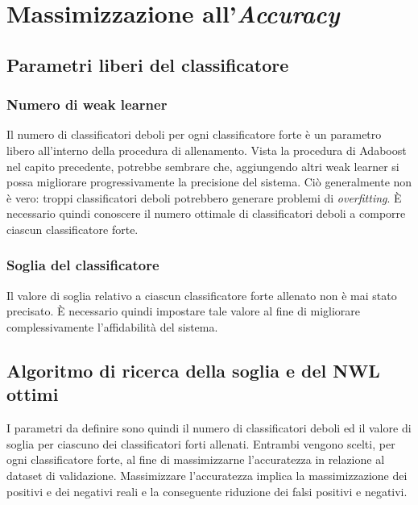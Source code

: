 
    \section{Massimizzazione all'\emph{Accuracy}}
    \label{sec:accuracy_maximization}
        \subsection{Parametri liberi del classificatore}
            \subsubsection{Numero di weak learner}
                Il numero di classificatori deboli per ogni classificatore forte è un parametro libero all'interno della procedura di allenamento.
                Vista la procedura di Adaboost nel capito precedente, potrebbe sembrare che, aggiungendo altri weak learner si possa migliorare progressivamente la precisione del sistema.
                Ciò generalmente non è vero: troppi classificatori deboli potrebbero generare problemi di \emph{overfitting}.
                È necessario quindi conoscere il numero ottimale di classificatori deboli a comporre ciascun classificatore forte.

            \subsubsection{Soglia del classificatore}
                Il valore di soglia relativo a ciascun classificatore forte allenato non è mai stato precisato.
                È necessario quindi impostare tale valore al fine di migliorare complessivamente l'affidabilità del sistema.

        \subsection{Algoritmo di ricerca della soglia e del NWL ottimi}
            I parametri da definire sono quindi il numero di classificatori deboli ed il valore di soglia per ciascuno dei classificatori forti allenati.
            Entrambi vengono scelti, per ogni classificatore forte, al fine di massimizzarne l'accuratezza in relazione al dataset di validazione.
            Massimizzare l'accuratezza implica la massimizzazione dei positivi e dei negativi reali e la conseguente riduzione dei falsi positivi e negativi.

